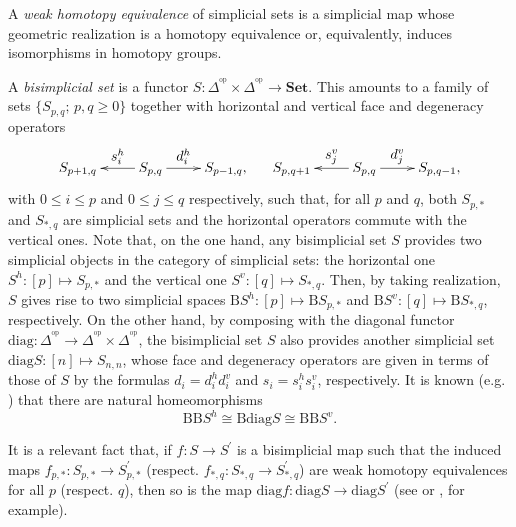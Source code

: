\documentclass[]{amsart}
\begin{document}
A {\em weak homotopy equivalence} of simplicial sets is a simplicial map whose geometric
realization is a homotopy equivalence or, equivalently, induces isomorphisms in homotopy groups.

A \emph{bisimplicial set} is a functor
$S:\Delta^{\!{^\mathrm{op}}}\times\Delta^{\!{^\mathrm{op}}}\rightarrow{\ensuremath{\mathbf{Set}}}$. This amounts to a
family of sets $\{S_{p,q};\,  p,q\geq 0\}$ together with horizontal and vertical face and
degeneracy operators
$$\xymatrix{S_{p+1,q}&\ar[l]_-{\textstyle s_i^h}S_{p,q}\ar[r]^-{\textstyle d_i^h}&S_{p-1,q}, \hspace{0.6cm}
S_{p,q+1}&\ar[l]_-{\textstyle s_j^v} S_{p,q}\ar[r]^-{\textstyle d_j^v}&S_{p,q-1},}
$$
with $0\leq i\leq p$ and $0\leq j\leq q$ respectively, such that, for all $p$ and $q$, both
$S_{p,\ast}$ and $S_{\ast,q}$ are simplicial sets and the horizontal operators commute with the
vertical ones. Note that, on the one hand, any bisimplicial set $S$ provides two simplicial objects
in the category of simplicial sets: the horizontal one $S^h:[p]\mapsto S_{p,\ast}$ and the vertical
one $S^v:[q]\mapsto S_{\ast,q}$. Then, by taking realization, $S$ gives rise to two simplicial
spaces ${\ensuremath{\mathrm{B}}} S^h:[p]\mapsto {\ensuremath{\mathrm{B}}} S_{p,\ast}$ and ${\ensuremath{\mathrm{B}}} S^v:[q]\mapsto {\ensuremath{\mathrm{B}}} S_{\ast,q}$,
respectively. On the other hand, by composing with the diagonal functor
${\ensuremath{\mathrm{diag}}}:\Delta^{\!{^\mathrm{op}}}\rightarrow\Delta^{\!{^\mathrm{op}}}\times\Delta^{\!{^\mathrm{op}}}$,
the bisimplicial set $S$ also provides another simplicial set ${\ensuremath{\mathrm{diag}}} S:[n]\mapsto S_{n,n}$, whose
face and degeneracy operators are given in terms of those of $S$ by the formulas $d_i=d_i^hd_i^v$
and $s_i=s_i^hs_i^v$, respectively. It is known (e.g. \cite[Lemma in page 86]{quillen}) that there
are natural homeomorphisms
\begin{equation}\label{homeo}
{\ensuremath{\mathrm{B}}}{\ensuremath{\mathrm{B}}} S^h \cong {\ensuremath{\mathrm{B}}}{\ensuremath{\mathrm{diag}}} S \cong {\ensuremath{\mathrm{B}}}{\ensuremath{\mathrm{B}}} S^v.
\end{equation}

It is a relevant fact  that,  if $f:S\rightarrow S^\prime$ is a bisimplicial map such that the
induced maps $ f_{p,\ast}: S_{p,\ast}\rightarrow  S^\prime_{p,\ast}$ (respect. $ f_{\ast,q}:
S_{\ast,q}\rightarrow S^\prime_{\ast,q}$) are weak homotopy equivalences for all $p$ (respect.
$q$), then so is the map ${\ensuremath{\mathrm{diag}}} f: {\ensuremath{\mathrm{diag}}} S \rightarrow {\ensuremath{\mathrm{diag}}} S^\prime$ (see \cite[Chapter XII, 4.2
and 4.3]{bousfield-kan} or \cite[IV, Proposition 1.7]{g-j}, for example).
\end{document}
